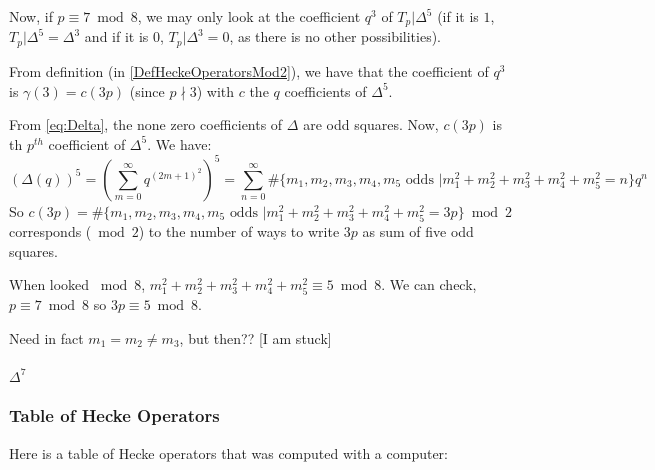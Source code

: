 Now, if $p \equiv 7 \bmod 8$, we may only look at the coefficient $q^3$ of $T_p|\Delta^5$ (if it is $1$, $T_p|\Delta^5 = \Delta^3$ and if it is $0$, $T_p|\Delta^3 = 0$, as there is no other possibilities).

From definition (in \ref{DefHeckeOperatorsMod2}), we have that the coefficient of $q^3$ is $\gamma(3) = c(3p)$ (since $p \nmid 3$) with $c$ the $q$ coefficients of $\Delta^5$.

From \eqref{eq:Delta}, the none zero coefficients of $\Delta$ are odd squares.
Now, $c(3p)$ is th $p^{th}$ coefficient of $\Delta^5$. We have:
$$
\left( \Delta(q) \right)^5
= \left( \sum_{m=0}^{\infty} q^{(2m+1)^2} \right)^5
= \sum_{n=0}^{\infty} \#\{m_1, m_2, m_3, m_4, m_5 \text{ odds } | m_1^2 + m_2^2 + m_3^2 + m_4^2 + m_5^2 = n\} q^n
$$
So $c(3p) = \#\{m_1, m_2, m_3, m_4, m_5 \text{ odds } | m_1^2 + m_2^2 + m_3^2 + m_4^2 + m_5^2 = 3p\} \bmod 2$ corresponds ($\bmod 2$) to the number of ways to write $3p$ as sum of five odd squares.

When looked $\bmod 8$, $m_1^2 + m_2^2 + m_3^2 + m_4^2 + m_5^2 \equiv 5 \bmod 8$.
We can check, $p \equiv 7 \bmod 8$ so $3p \equiv 5 \bmod 8$.







Need in fact $m_1 = m_2 \neq m_3$, but then??
[I am stuck]






\paragraph{$\Delta^7$}

\subsubsection{Table of Hecke Operators}
Here is a table of Hecke operators that was computed with a computer:


